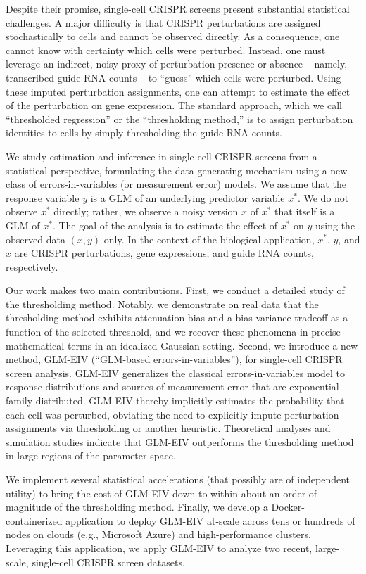 \documentclass[12pt]{article}
\begin{document}
Despite their promise, single-cell CRISPR screens present substantial statistical challenges. A major difficulty is that CRISPR perturbations are assigned stochastically to cells and cannot be observed directly. As a consequence, one cannot know with certainty which cells were perturbed. Instead, one must leverage an indirect, noisy proxy of perturbation presence or absence -- namely, transcribed guide RNA counts -- to ``guess'' which cells were perturbed. Using these imputed perturbation assignments, one can attempt to estimate the effect of the perturbation on gene expression. The standard approach, which we call ``thresholded regression'' or the ``thresholding method,'' is to assign perturbation identities to cells by simply thresholding the guide RNA counts.

We study estimation and inference in single-cell CRISPR screens from a statistical perspective, formulating the data generating mechanism using a new class of errors-in-variables (or measurement error) models. We assume that the response variable $y$ is a GLM of an underlying predictor variable $x^*$. We do not observe $x^*$ directly; rather, we observe a noisy version $x$ of $x^*$ that itself is a GLM of $x^*$. The goal of the analysis is to estimate the effect of $x^*$ on $y$ using the observed data $(x , y)$ only. In the context of the biological application, $x^*$, $y$, and $x$ are CRISPR perturbations, gene expressions, and guide RNA counts, respectively.

Our work makes two main contributions. First, we conduct a detailed study of the thresholding method. Notably, we demonstrate on real data that the thresholding method exhibits attenuation bias and a bias-variance tradeoff as a function of the selected threshold, and we recover these phenomena in precise mathematical terms in an idealized Gaussian setting. Second, we introduce a new method, GLM-EIV (``GLM-based errors-in-variables''), for single-cell CRISPR screen analysis. GLM-EIV generalizes the classical errors-in-variables model to response distributions and sources of measurement error that are exponential family-distributed. GLM-EIV thereby implicitly estimates the probability that each cell was perturbed, obviating the need to explicitly impute perturbation assignments via thresholding or another heuristic. Theoretical analyses and simulation studies indicate that GLM-EIV outperforms the thresholding method in large regions of the parameter space.

We implement several statistical accelerations (that possibly are of independent utility) to bring the cost of GLM-EIV down to within about an order of magnitude of the thresholding method. Finally, we develop a Docker-containerized application to deploy GLM-EIV at-scale across tens or hundreds of nodes on clouds (e.g., Microsoft Azure) and high-performance clusters. Leveraging this application, we apply GLM-EIV to analyze two recent, large-scale, single-cell CRISPR screen datasets. %
\end{document}
